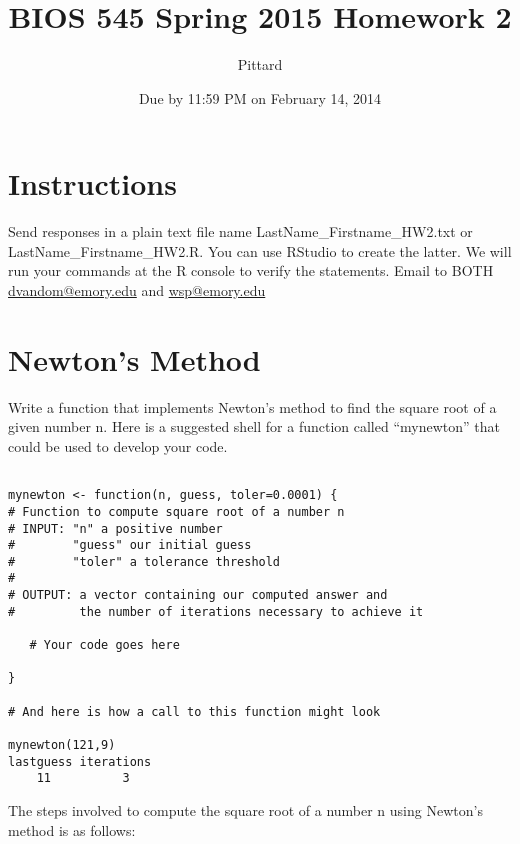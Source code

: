 \documentclass{article}
\begin{document}

\title{BIOS 545 Spring 2015 Homework 2}
\author{Pittard}
\date{Due by 11:59 PM on February 14, 2014}
\maketitle


\section*{Instructions}
Send responses in a plain text file name LastName\_Firstname\_HW2.txt or LastName\_Firstname\_HW2.R. You can use RStudio to create the latter. We will run your commands at the R console to verify the statements. Email to BOTH \url{dvandom@emory.edu} and \url{wsp@emory.edu}

\section{Newton's Method} Write a function that implements Newton's method to find the square root of a given number n. Here is a suggested shell for a function called ``mynewton'' that could be used to develop your code.
\begin{verbatim}

mynewton <- function(n, guess, toler=0.0001) {
# Function to compute square root of a number n
# INPUT: "n" a positive number
#        "guess" our initial guess
#        "toler" a tolerance threshold
#
# OUTPUT: a vector containing our computed answer and 
#         the number of iterations necessary to achieve it

   # Your code goes here

}

# And here is how a call to this function might look

mynewton(121,9)
lastguess iterations 
    11          3  
\end{verbatim}

The steps involved to compute the square root of a number n using Newton's method is as follows:
\end{document}
